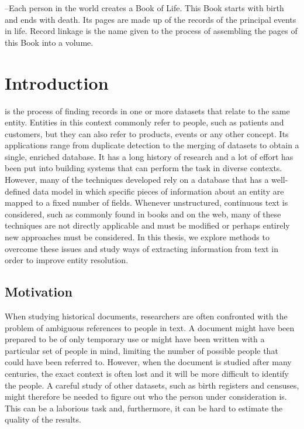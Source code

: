 \begin{savequote}[75mm] 
--Each person in the world creates a Book of Life. This Book starts with birth and ends with death. Its pages are made up of the records of the principal events in life. Record linkage is the name given to the process of assembling the pages of this Book into a volume.
\end{savequote}




\chapter{Introduction}
\label{ch:introduction}

 is the process of finding records in one or more datasets that relate to the same entity.
Entities in this context commonly refer to people, such as patients and customers, but they can also refer to products, events or any other concept.
Its applications range from duplicate detection to the merging of datasets to obtain a single, enriched database.
It has a long history of research and a lot of effort has been put into building systems that can perform the task in diverse contexts.
However, many of the techniques developed rely on a database that has a well-defined data model in which specific pieces of information about an entity are mapped to a fixed number of fields.
Whenever unstructured, continuous text is considered, such as commonly found in books and on the web, many of these techniques are not directly applicable and must be modified or perhaps entirely new approaches must be considered.
In this thesis, we explore methods to overcome these issues and study ways of extracting information from text in order to improve entity resolution.




\section{Motivation}
\label{sec:motivation}

When studying historical documents, researchers are often confronted with the problem of ambiguous references to people in text.
A document might have been prepared to be of only temporary use or might have been written with a particular set of people in mind, limiting the number of possible people that could have been referred to.
However, when the document is studied after many centuries, the exact context is often lost and it will be more difficult to identify the people.
A careful study of other datasets, such as birth registers and censuses, might therefore be needed to figure out who the person under consideration is.
This can be a laborious task and, furthermore, it can be hard to estimate the quality of the results.

